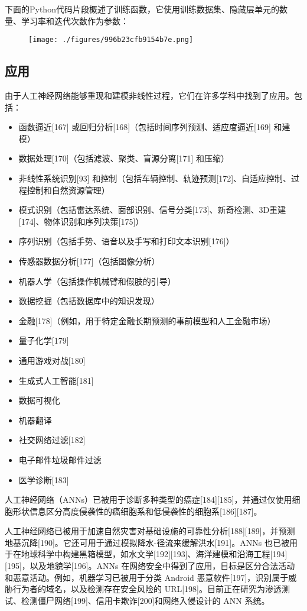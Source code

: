下面的Python代码片段概述了训练函数，它使用训练数据集、隐藏层单元的数量、学习率和迭代次数作为参数：
\begin{figure}[ht]
\centering
\texttt{[image: ./figures/996b23cfb9154b7e.png]}
\caption{} \label{fig_RGSJ_3}
\end{figure}
\subsection{应用}  
由于人工神经网络能够重现和建模非线性过程，它们在许多学科中找到了应用。包括：
\begin{itemize}
\item 函数逼近[167] 或回归分析[168]（包括时间序列预测、适应度逼近[169] 和建模）
\item 数据处理[170]（包括滤波、聚类、盲源分离[171] 和压缩）
\item 非线性系统识别[93] 和控制（包括车辆控制、轨迹预测[172]、自适应控制、过程控制和自然资源管理）
\item 模式识别（包括雷达系统、面部识别、信号分类[173]、新奇检测、3D重建[174]、物体识别和序列决策[175]）
\item 序列识别（包括手势、语音以及手写和打印文本识别[176]）
\item 传感器数据分析[177]（包括图像分析）
\item 机器人学（包括操作机械臂和假肢的引导）
\item 数据挖掘（包括数据库中的知识发现）
\item 金融[178]（例如，用于特定金融长期预测的事前模型和人工金融市场）
\item 量子化学[179]
\item 通用游戏对战[180]
\item 生成式人工智能[181]
\item 数据可视化
\item 机器翻译
\item 社交网络过滤[182]
\item 电子邮件垃圾邮件过滤
\item 医学诊断[183]
\end{itemize}
人工神经网络（ANNs）已被用于诊断多种类型的癌症[184][185]，并通过仅使用细胞形状信息区分高度侵袭性的癌细胞系和低侵袭性的细胞系[186][187]。

人工神经网络已被用于加速自然灾害对基础设施的可靠性分析[188][189]，并预测地基沉降[190]。它还可用于通过模拟降水-径流来缓解洪水[191]。ANNs 也已被用于在地球科学中构建黑箱模型，如水文学[192][193]、海洋建模和沿海工程[194][195]，以及地貌学[196]。ANNs 在网络安全中得到了应用，目标是区分合法活动和恶意活动。例如，机器学习已被用于分类 Android 恶意软件[197]，识别属于威胁行为者的域名，以及检测存在安全风险的 URL[198]。目前正在研究为渗透测试、检测僵尸网络[199]、信用卡欺诈[200]和网络入侵设计的 ANN 系统。

